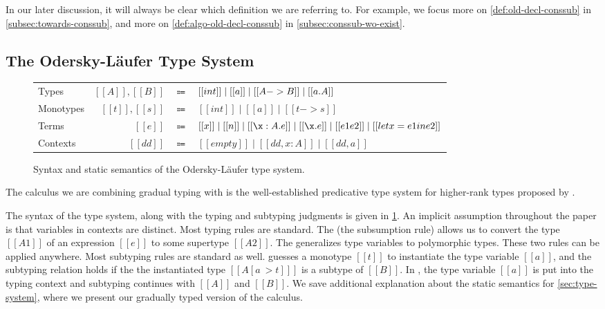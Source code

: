 In our later discussion, it will always be clear which definition we are referring
to. For example, we focus more on \cref{def:old-decl-conssub} in
\cref{subsec:towards-conssub}, and more on \cref{def:algo-old-decl-conssub} in
\cref{subsec:conssub-wo-exist}.


\subsection{The Odersky-L{\"a}ufer Type System}

\begin{figure}[t]
  \begin{small}
    \centering
    \begin{tabular}{lrcl} \toprule
      Types & $[[A]], [[B]]$ & $\Coloneqq$ & $[[int]] \mid [[a]] \mid [[A -> B]] \mid [[\/ a. A]]  $ \\
      Monotypes & $[[t]], [[s]]$ & $\Coloneqq$ & $ [[int]] \mid [[a]] \mid [[t -> s]] $ \\
      Terms & $[[e]]$ & $\Coloneqq$ & $ [[x]]  \mid [[n]]  \mid [[\x : A . e]] \mid [[ \x . e ]] \mid [[e1 e2]] \mid [[ let x = e1 in e2  ]] $ \\
      Contexts & $[[dd]]$ & $\Coloneqq$ & $ [[empty]]  \mid [[dd , x : A]]  \mid [[dd, a]]$ \\
      \bottomrule
    \end{tabular}



  \end{small}
  \caption{Syntax and static semantics of the Odersky-L{\"a}ufer type system.}
  \label{fig:original-typing}
\end{figure}


The calculus we are combining gradual typing with is the well-established
predicative type system for higher-rank types proposed by
\citet{odersky1996putting}.

The syntax of the type system, along with the typing and subtyping judgments is
given in \cref{fig:original-typing}. An implicit assumption throughout the paper
is that variables in contexts are distinct. Most typing rules are standard.
The  (the subsumption rule) allows us to convert the type $[[A1]]$
of an expression $[[e]]$ to some 
supertype $[[A2]]$. The  generalizes type variables to polymorphic
types. These two rules can be applied anywhere.
Most subtyping rules are standard as well.  guesses a monotype
$[[t]]$ to instantiate the type variable $[[a]]$, and the subtyping relation
holds if the the instantiated type $[[ A[a ~> t] ]]$ is a subtype of $[[B]]$. In
, the type variable $[[a]]$ is put into the typing context and
subtyping continues with $[[A]]$ and $[[B]]$.
We save additional explanation about
the static semantics for \cref{sec:type-system}, where we present our gradually
typed version of the calculus.


